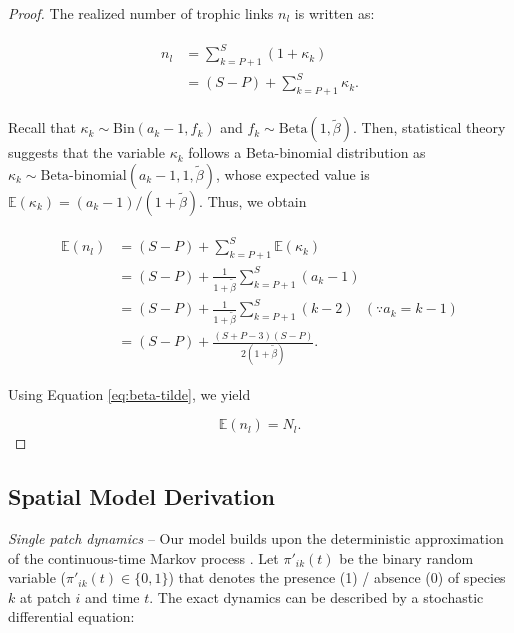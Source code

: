 \documentclass[11pt, class=article, crop=false]{standalone}
\theoremstyle{definition}
\begin{document}
\begin{proof}
    The realized number of trophic links $n_l$ is written as:

    \begin{align}
        \begin{split}
            n_l &= \sum_{k = P + 1}^{S}(1 + \kappa_k)\\ 
                &= (S - P) + \sum_{k = P + 1}^{S} \kappa_k.
        \end{split}
    \end{align}

    Recall that $\kappa_k \sim \mbox{Bin}(a_k - 1, f_k)$ and $f_k \sim \mbox{Beta}(1, \tilde{\beta})$.
    Then, statistical theory suggests that the variable $\kappa_k$ follows a Beta-binomial distribution as $\kappa_k \sim \mbox{Beta-binomial}(a_k - 1, 1, \tilde{\beta})$, whose expected value is $\mathbb{E}(\kappa_k) = (a_k - 1) / (1 + \tilde{\beta})$.
    Thus, we obtain

    \begin{align}
    \begin{split}
        \mathbb{E}(n_l) 
        &= (S - P) + \sum_{k = P + 1}^{S} \mathbb{E}(\kappa_k)\\
        &= (S - P) + \frac{1}{1 + \tilde{\beta}} \sum_{k = P + 1}^{S} (a_k - 1)\\
        &= (S - P) + \frac{1}{1 + \tilde{\beta}} \sum_{k = P + 1}^{S} (k - 2)~~~(\because a_k = k - 1)\\
        &= (S - P) + \frac{(S + P - 3)(S - P)}{2 (1 + \tilde{\beta})}.
    \end{split}
    \end{align}

    Using Equation \ref{eq:beta-tilde}, we yield

    \begin{equation}
        \mathbb{E}(n_l)  = N_l.
    \end{equation}
    
\end{proof}

\newpage

\subsection{Spatial Model Derivation}

\textit{Single patch dynamics} --
Our model builds upon the deterministic approximation of the continuous-time Markov process \cite{ovaskainen_asymptotically_2006}.
Let $\pi'_{ik}(t)$ be the binary random variable ($\pi'_{ik}(t) \in \{0, 1\}$) that denotes the presence (1) / absence (0) of species $k$ at patch $i$ and time $t$.
The exact dynamics can be described by a stochastic differential equation:
\end{document}
